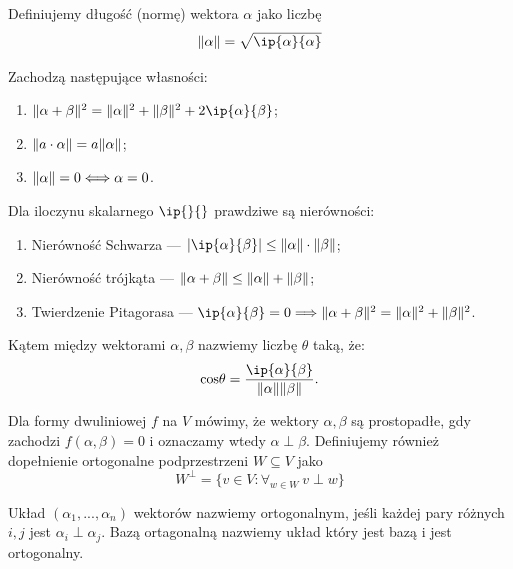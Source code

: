 \documentclass[11pt, a4paper]{article}
\begin{document}
\begin{definition}
    Definiujemy długość (normę) wektora \(\alpha\) jako liczbę
    \[ \norm{\alpha} = \sqrt{ \ip{\alpha}{\alpha} } \]
\end{definition}

\begin{lemma}
    Zachodzą następujące własności:
    \begin{enumerate}
        \item \( \norm{\alpha + \beta}^2 = \norm{\alpha}^2 + \norm{\beta}^2 + 2 \ip{\alpha}{\beta} \);
        \item \( \lVert a \cdot \alpha \rVert = a \lVert\alpha\rVert\);
        \item \( \lVert \alpha \rVert = 0 \Longleftrightarrow \alpha = 0 \).
    \end{enumerate}
\end{lemma}
\begin{lemma}
    Dla iloczynu skalarnego \(\ip{}{}\) prawdziwe są nierówności:
    \begin{enumerate}
        \item Nierówność Schwarza --- \(\abs{\ip{\alpha}{\beta}} \leq
        \norm{\alpha} \cdot \norm{\beta}\);
        \item Nierówność trójkąta --- \(\lVert\alpha + \beta\rVert \leq \lVert\alpha\rVert
        + \lVert\beta\rVert\);
        \item Twierdzenie Pitagorasa --- \(\ip{\alpha}{\beta} = 0 \Longrightarrow
        \norm{\alpha + \beta}^2 = \norm{\alpha}^2 + \norm{\beta}^2\).
    \end{enumerate}
\end{lemma}

\begin{definition}
    Kątem między wektorami \(\alpha, \beta\) nazwiemy liczbę \(\theta\) taką, że:
    \[\text{cos}\theta = \frac{\ip{\alpha}{\beta}}{\norm{\alpha}\norm{\beta}}.\]
\end{definition}
\newpage
\begin{definition}
	Dla formy dwuliniowej \(f\) na \(V\) mówimy, że wektory \(\alpha, \beta\) są
	prostopadłe, gdy zachodzi \(f(\alpha, \beta) = 0\) i oznaczamy wtedy \(\alpha \perp \beta\).
	Definiujemy również dopełnienie ortogonalne podprzestrzeni \(W \subseteq V\)
	jako \[W^{\perp} = \{v \in V : \forall_{w \in W}\ v \perp w\}\]
\end{definition}

\begin{definition}
    Układ \((\alpha_1, ..., \alpha_n)\) wektorów nazwiemy ortogonalnym, jeśli każdej
    pary różnych \(i, j\) jest \(\alpha_i \perp \alpha_j\).
    Bazą ortagonalną nazwiemy układ który jest bazą i jest ortogonalny.
\end{definition}
\end{document}
